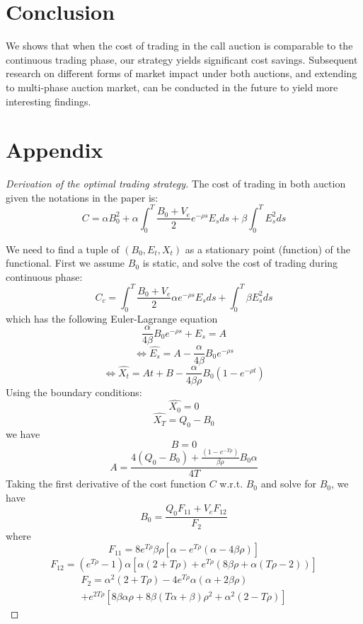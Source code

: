 \documentclass{article}
\begin{document}
\section{Conclusion}\label{secConclusion}
We shows that when the cost of trading in the call auction is comparable to the continuous trading phase, our strategy yields significant cost savings. Subsequent research on different forms of market impact under both auctions, and extending to multi-phase auction market, can be conducted in the future to yield more interesting findings.

\section{Appendix}

\begin{proof}[Derivation of the optimal trading strategy]\label{proof:optimal-strategy}
  The cost of trading in both auction given the notations in the paper is:
  \[
    C = \alpha B_0^2  + \alpha \int_0^T \frac{B_0 + V_e}{2} e^{-\rho s} E_s ds + \beta \int_0^T E_s^2 ds
  \]

  We need to find a tuple of $(B_0, E_t, X_t)$ as a stationary point (function) of the functional. First we assume $B_0$ is static, and solve the cost of trading during continuous phase:
  \[
    C_c = \int_0^T \frac{B_0 + V_e}{2} \alpha e^{-\rho s} E_s ds + \int_0^T  \beta E_s^2 ds
  \]
  which has the following Euler-Lagrange equation
  \[
    \frac{\alpha}{4 \beta} B_0  e^{-\rho s} +E_s = A
  \]
  \[
    \Leftrightarrow \hat{E_s} = A - \frac{\alpha}{4 \beta} B_0 e^{-\rho s}
  \]
  \[
    \Leftrightarrow \hat{X_t} = At + B - \frac{\alpha}{4 \beta \rho}B_ 0 (1 - e^{-\rho t})
  \]
  Using the boundary conditions:
  \[
    \hat{X_0} = 0
  \]
  \[
    \hat{X_T} = Q_0 - B_0
  \]
  we have
  \[
    B = 0
  \]
  \[
    A = \frac{4 (Q_0 - B_0) + \frac{(1 - e^{-T \rho})}{\beta \rho} B_0 \alpha} {4 T}
  \]
  Taking the first derivative of the cost function $C$ w.r.t. $B_0$ and solve for $B_0$, we have
  \[
    B_0 = \frac{Q_0 F_{11} + V_e F_{12}}{F_2}
  \]
  where
  \[
    F_{11} = 8 e^{T \rho} \beta \rho [\alpha - e^{T \rho} (\alpha - 4 \beta \rho)]
  \]
  \[
    F_{12} = (e^{T \rho}-1) \alpha [\alpha (2+T \rho) + e^{T \rho} (8 \beta \rho + \alpha (T \rho - 2 ))]
  \]
  \[
    \begin{split}
      F_2 = \alpha^2 (2 + T \rho) - 4 e^{T \rho} \alpha (\alpha + 2 \beta \rho)\ \\
      + e^{2 T \rho} [8 \beta \alpha \rho + 8 \beta (T \alpha + \beta) \rho^2 + \alpha^2 (2 - T \rho)]
    \end{split}
  \]

\end{proof}



\end{document}
